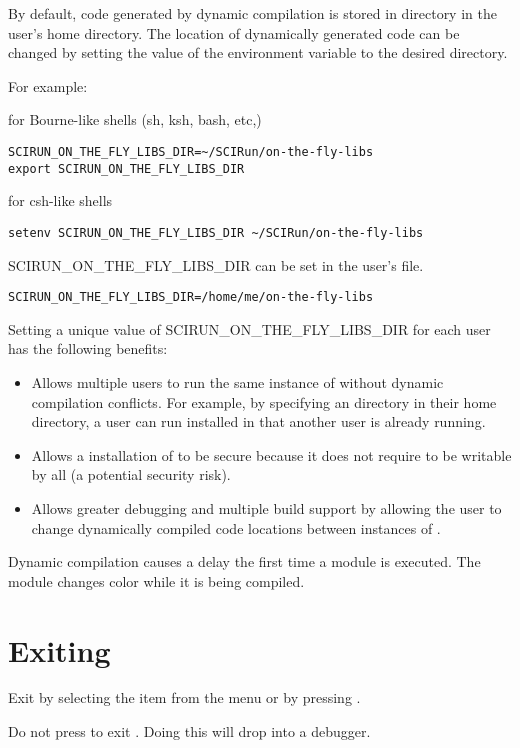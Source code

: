 By default, code generated by dynamic compilation is stored in
directory  in the user's home directory.
The location of dynamically generated code can be changed by setting
the value of the environment variable
 to the desired directory.

For example:

for Bourne-like shells (sh, ksh, bash, etc,)

\begin{verbatim}
SCIRUN_ON_THE_FLY_LIBS_DIR=~/SCIRun/on-the-fly-libs
export SCIRUN_ON_THE_FLY_LIBS_DIR
\end{verbatim}

for csh-like shells

\begin{verbatim}
setenv SCIRUN_ON_THE_FLY_LIBS_DIR ~/SCIRun/on-the-fly-libs
\end{verbatim}

SCIRUN\_ON\_THE\_FLY\_LIBS\_DIR can be set in the user's
 file.

\begin{verbatim}
SCIRUN_ON_THE_FLY_LIBS_DIR=/home/me/on-the-fly-libs
\end{verbatim}

Setting a unique value of SCIRUN\_ON\_THE\_FLY\_LIBS\_DIR for each
\sr{} user has the following benefits:

\begin{itemize}
\item Allows multiple users  to run the same 
  instance of \sr{} without
  dynamic compilation conflicts.  For example, by specifying an
   directory in their home directory, a user
  can run \sr{} installed in  that another user
  is already running.

\item Allows a  installation of \sr{}
  to be secure because it does not require
   to be writable by
  all (a potential security risk).

\item Allows greater debugging and multiple build support by
  allowing the user to change dynamically compiled code locations
  between instances of \sr{}.

\end{itemize}

Dynamic compilation causes a delay the first time a module is
executed.  The module changes color while it is being
compiled.

\section{Exiting \sr{}}
\label{sec:stopping}

Exit \sr{} by selecting the  item from the 
menu or by pressing .

Do not press  to exit \sr{}.  Doing this will drop
\sr{} into a debugger.
